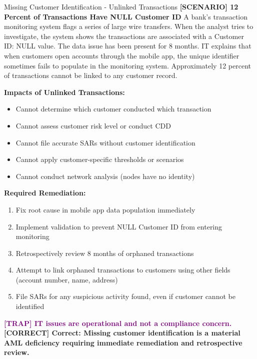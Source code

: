 \documentclass[11pt,a4paper]{beamer}
\newcommand{\trap}[1]{\textcolor{purple}{\textbf{[TRAP] #1}}}
\newcommand{\correct}[1]{\textcolor{green!50!black}{\textbf{[CORRECT] #1}}}
\newcommand{\scenario}[1]{\textcolor{blue!70!black}{\textbf{[SCENARIO] #1}}}
\begin{document}
	\begin{frame}{Missing Customer Identification - Unlinked Transactions}
		\scenario{12 Percent of Transactions Have NULL Customer ID}
		A bank's transaction monitoring system flags a series of large wire transfers. When the analyst tries to investigate, the system shows the transactions are associated with a Customer ID: NULL value. The data issue has been present for 8 months. IT explains that when customers open accounts through the mobile app, the unique identifier sometimes fails to populate in the monitoring system. Approximately 12 percent of transactions cannot be linked to any customer record.
		
		\textbf{Impacts of Unlinked Transactions:}
		\begin{itemize}
			\item Cannot determine which customer conducted which transaction
			\item Cannot assess customer risk level or conduct CDD
			\item Cannot file accurate SARs without customer identification
			\item Cannot apply customer-specific thresholds or scenarios
			\item Cannot conduct network analysis (nodes have no identity)
		\end{itemize}
		
		\textbf{Required Remediation:}
		\begin{enumerate}
			\item Fix root cause in mobile app data population immediately
			\item Implement validation to prevent NULL Customer ID from entering monitoring
			\item Retrospectively review 8 months of orphaned transactions
			\item Attempt to link orphaned transactions to customers using other fields (account number, name, address)
			\item File SARs for any suspicious activity found, even if customer cannot be identified
		\end{enumerate}
		
		\trap{IT issues are operational and not a compliance concern.}
		\correct{Correct: Missing customer identification is a material AML deficiency requiring immediate remediation and retrospective review.}
	\end{frame}
	
\end{document}
